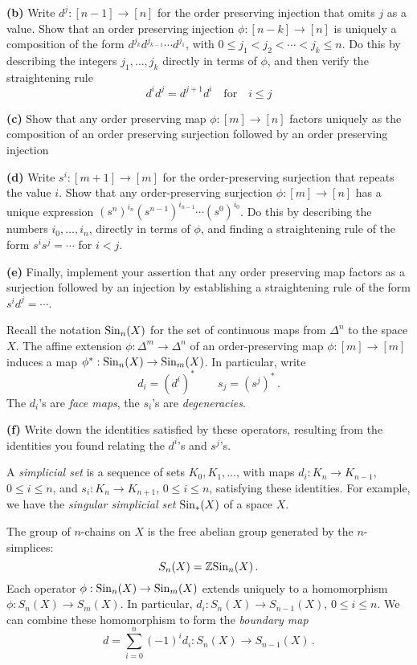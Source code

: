 \documentclass[12pt]{article}
\begin{document}
{\bf (b)} Write $d^j:[n-1]\rightarrow[n]$ for the order preserving
injection that omits $j$ as a value. Show that an order preserving
injection $\phi:[n-k]\rightarrow[n]$ is uniquely a composition of the form
$d^{j_k}d^{j_{k-1}}\cdots d^{j_1}$, with $0\leq j_1<j_2<\cdots<j_k\leq n$.
Do this by describing the integers $j_1,\ldots,j_k$ directly in terms of 
$\phi$, and then verify the straightening rule 
\[
d^id^j=d^{j+1}d^i \quad\mathrm{for}\quad i\leq j
\]

{\bf (c)} Show that any order preserving map $\phi:[m]\to[n]$ factors
uniquely as the composition of an order preserving surjection followed by an 
order preserving injection

{\bf (d)} Write $s^i:[m+1]\rightarrow[m]$ for the order-preserving surjection 
that repeats the value $i$. Show that any order-preserving surjection 
$\phi:[m]\to[n]$ has a unique 
expression $(s^n)^{i_n}(s^{n-1})^{i_{n-1}}\cdots(s^0)^{i_0}$.
Do this by describing the numbers $i_0,\ldots,i_n$,
directly in terms of $\phi$, and finding a straightening rule
of the form $s^is^j=\cdots$ for $i<j$. 

{\bf(e)} 
Finally, implement your assertion that any order preserving map factors
as a surjection followed by an injection by establishing a straightening 
rule of the form $s^id^j=\cdots$.

Recall the notation $\mathrm{Sin}_n(X)$ for the set of continuous maps from $\Delta^n$ to the space $X$. 
The affine extension $\phi:\Delta^m\to\Delta^n$ of an order-preserving
map $\phi:[m]\to[m]$ induces a map $\phi^*:\mathrm{Sin}_n(X)\to\mathrm{Sin}_m(X)$.
In particular, write 
\[
d_i=(d^i)^*\quad\quad s_j=(s^j)^*\,.
\]
The $d_i$'s are {\em face maps}, the $s_i$'s are {\em degeneracies}.

{\bf(f)} 
Write down the identities satisfied by these operators, resulting from
the identities you found relating the $d^i$'s and $s^j$'s.

A {\em simplicial set} is a sequence of
sets $K_0,K_1,\ldots$, with maps $d_i:K_n\to K_{n-1}$, $0\leq i\leq n$, 
and $s_i:K_n\to K_{n+1}$, $0\leq i\leq n$, satisfying these identities.
For example, we have the {\em singular simplicial set} $\mathrm{Sin}_*(X)$
of a space $X$.

The group of $n$-chains on $X$ is the free abelian group generated by the
$n$-simplices:
\[
S_n(X)=\mathbb Z\mathrm{Sin}_n(X)\,.
\]
Each operator $\phi:\mathrm{Sin}_n(X)\to\mathrm{Sin}_m(X)$ extends uniquely to a homomorphism
$\phi:S_n(X)\to S_m(X)$. In particular, $d_i:S_n(X)\to S_{n-1}(X)$, 
$0\leq i\leq n$. We can combine these homomorphism to form the 
{\em boundary map} 
\[
d=\sum_{i=0}^n(-1)^id_i:S_n(X)\to S_{n-1}(X)\,.
\]
\end{document}
